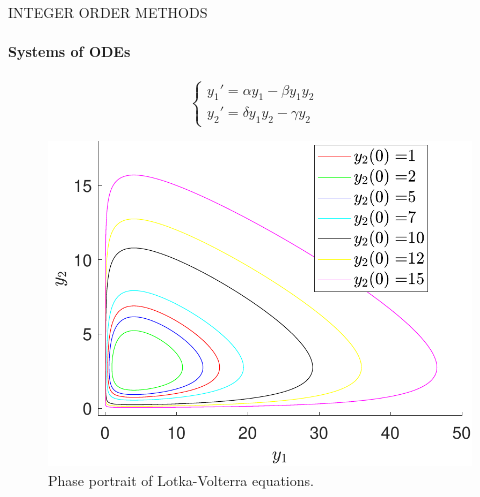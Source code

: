 \begin{frame}{INTEGER ORDER METHODS}
    \framesubtitle{Systems of ODEs}
\begin{equation}
    \begin{cases}{y_1'=\alpha y_1-\beta y_1 y_2}& \\ {y_2'=\delta y_1 y_2-\gamma y_2}&\end{cases}
\end{equation}
\begin{figure}[H]
    \centering
    \includegraphics[scale=0.4]{files/Prey.pdf}
    \caption{Phase portrait of Lotka-Volterra equations.}
    \label{fig:lotka}
\end{figure}

\end{frame}


